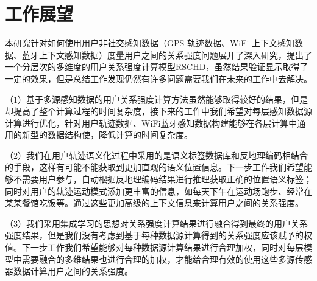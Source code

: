 \section{工作展望}
\label{sec:section6-2}
本研究针对如何使用用户非社交感知数据（GPS 轨迹数据、WiFi 上下文感知数据、蓝牙上下文感知数据）度量用户之间的关系强度问题展开了深入研究，提出了一个分层次的多维度的用户关系强度计算模型RSCHD，虽然结果验证显示取得了一定的效果，但是总结工作发现仍然有许多问题需要我们在未来的工作中去解决。
\par （1）基于多源感知数据的用户关系强度计算方法虽然能够取得较好的结果，但是却提高了整个计算过程的时间复杂度，接下来的工作中我们希望对每层感知数据源计算进行优化，针对用户轨迹数据、WiFi蓝牙感知数据构建能够在各层计算中通用的新型的数据结构使，降低计算的时间复杂度。
\par （2）我们在用户轨迹语义化过程中采用的是语义标签数据库和反地理编码相结合的手段，这样有可能不能获取到更加直观的语义位置信息。下一步工作我们希望能够不需要用户参与，自动根据反地理编码结果进行推理获取正确的位置语义标签；同时对用户的轨迹运动模式添加更丰富的信息，如每天下午在运动场跑步、经常在某某餐馆吃饭等。通过这些更加高级的上下文信息来计算用户之间的关系强度。
\par （3）我们采用集成学习的思想对关系强度计算结果进行融合得到最终的用户关系强度结果，但是我们没有考虑到基于每种数据源计算得到的关系强度应该赋予的权值。下一步工作我们希望能够对每种数据源计算结果进行合理加权，同时对每层模型中需要融合的多维结果也进行合理的加权，才能给合理有效的使用这些多源传感器数据计算用户之间的关系强度。
